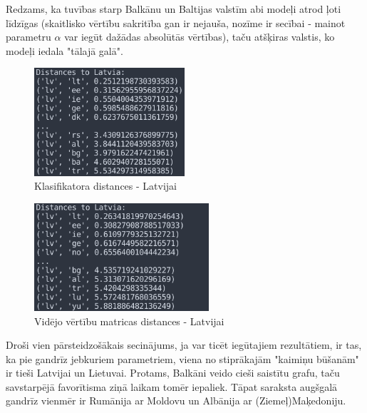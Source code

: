 \documentclass[12pt, a4paper]{article}
\begin{document}
Redzams, ka tuvības starp Balkānu un Baltijas valstīm abi modeļi atrod ļoti līdzīgas (skaitlisko vērtību sakritība gan ir nejauša, nozīme ir secībai - mainot parametru $\alpha$ var iegūt dažādas absolūtās vērtības), taču atšķiras valstis, ko modeļi iedala "tālajā galā".

\begin{figure}[h!]
    \centering
    \includegraphics[height=4cm,page=1]{../img/close-far-lv-classifier.png}
    \caption{Klasifikatora distances - Latvijai}
\end{figure}
\begin{figure}[h!]
    \centering
    \includegraphics[height=4cm,page=1]{../img/close-far-lv-model.png}
    \caption{Vidējo vērtību matricas distances - Latvijai}
\end{figure}

Droši vien pārsteidzošākais secinājums, ja var ticēt iegūtajiem rezultātiem, ir tas, ka pie gandrīz jebkuriem parametriem, viena no stiprākajām "kaimiņu būšanām" ir tieši Latvijai un Lietuvai. Protams, Balkāni veido cieši saistītu grafu, taču savstarpējā favorītisma ziņā laikam tomēr iepaliek. Tāpat saraksta augšgalā gandrīz vienmēr ir Rumānija ar Moldovu un Albānija ar (Ziemeļ)Maķedoniju.
\end{document}
